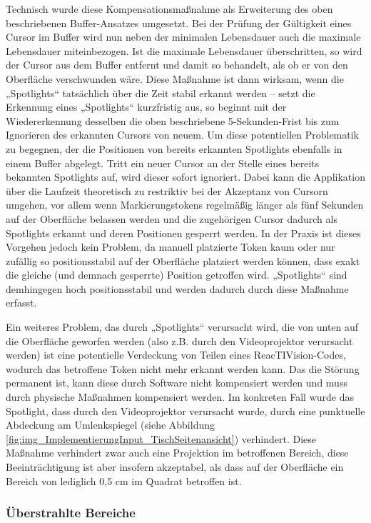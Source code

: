Technisch wurde diese Kompensationsmaßnahme als Erweiterung des oben beschriebenen Buffer-Ansatzes umgesetzt. Bei der Prüfung der Gültigkeit eines Cursor im Buffer wird nun neben der minimalen Lebensdauer auch die maximale Lebensdauer miteinbezogen. Ist die maximale Lebensdauer überschritten, so wird der Cursor aus dem Buffer entfernt und damit so behandelt, als ob er von den Oberfläche verschwunden wäre. Diese Maßnahme ist dann wirksam, wenn die „Spotlights“ tatsächlich über die Zeit stabil erkannt werden -- setzt die Erkennung eines „Spotlights“ kurzfristig aus, so beginnt mit der Wiedererkennung desselben die oben beschriebene 5-Sekunden-Frist bis zum Ignorieren des erkannten Cursors von neuem. Um diese potentiellen Problematik zu begegnen, der die Positionen von bereits erkannten Spotlights ebenfalls in einem Buffer abgelegt. Tritt ein neuer Cursor an der Stelle eines bereits bekannten Spotlights auf, wird dieser sofort ignoriert. Dabei kann die Applikation über die Laufzeit theoretisch zu restriktiv bei der Akzeptanz von Cursorn umgehen, vor allem wenn Markierungstokens regelmäßig länger als fünf Sekunden auf der Oberfläche belassen werden und die zugehörigen Cursor dadurch als Spotlights erkannt und deren Positionen gesperrt werden. In der Praxis ist dieses Vorgehen jedoch kein Problem, da manuell platzierte Token kaum oder nur zufällig so positionsstabil auf der Oberfläche platziert werden können, dass exakt die gleiche (und demnach gesperrte) Position getroffen wird. „Spotlights“ sind demhingegen hoch positionsstabil und werden dadurch durch diese Maßnahme erfasst.

Ein weiteres Problem, das durch „Spotlights“ verursacht wird, die von unten auf die Oberfläche geworfen werden (also z.B. durch den Videoprojektor verursacht werden) ist eine potentielle Verdeckung von Teilen eines ReacTIVision-Codes, wodurch das betroffene Token nicht mehr erkannt werden kann. Das die Störung permanent ist, kann diese durch Software nicht kompensiert werden und muss durch physische Maßnahmen kompensiert werden. Im konkreten Fall wurde das Spotlight, dass durch den Videoprojektor verursacht wurde, durch eine punktuelle Abdeckung am Umlenkspiegel (siehe Abbildung \ref{fig:img_ImplementierungInput_TischSeitenansicht}) verhindert. Diese Maßnahme verhindert zwar auch eine Projektion im betroffenen Bereich, diese Beeinträchtigung ist aber insofern akzeptabel, als dass auf der Oberfläche ein Bereich von lediglich 0,5 cm im Quadrat betroffen ist.

\subsubsection{Überstrahlte Bereiche} %
\label{ssub:überstrahlung}


